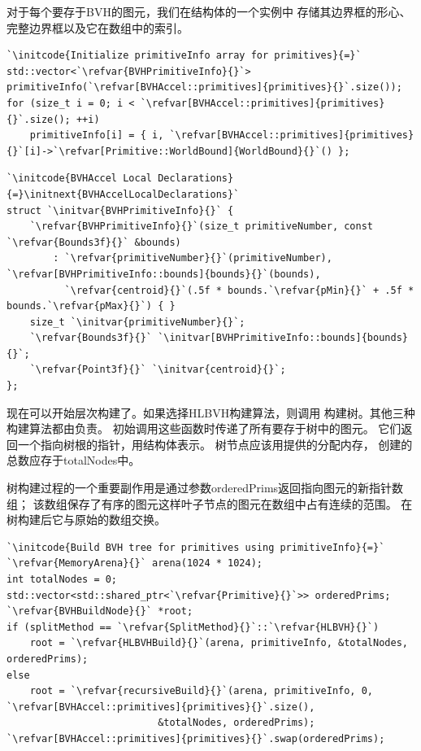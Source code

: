 对于每个要存于BVH的图元，我们在结构体的一个实例中
存储其边界框的形心、完整边界框以及它在数组中的索引。
\begin{lstlisting}
`\initcode{Initialize primitiveInfo array for primitives}{=}`
std::vector<`\refvar{BVHPrimitiveInfo}{}`> primitiveInfo(`\refvar[BVHAccel::primitives]{primitives}{}`.size());
for (size_t i = 0; i < `\refvar[BVHAccel::primitives]{primitives}{}`.size(); ++i)
    primitiveInfo[i] = { i, `\refvar[BVHAccel::primitives]{primitives}{}`[i]->`\refvar[Primitive::WorldBound]{WorldBound}{}`() };
\end{lstlisting}
\begin{lstlisting}
`\initcode{BVHAccel Local Declarations}{=}\initnext{BVHAccelLocalDeclarations}`
struct `\initvar{BVHPrimitiveInfo}{}` {
    `\refvar{BVHPrimitiveInfo}{}`(size_t primitiveNumber, const `\refvar{Bounds3f}{}` &bounds)
        : `\refvar{primitiveNumber}{}`(primitiveNumber), `\refvar[BVHPrimitiveInfo::bounds]{bounds}{}`(bounds),
          `\refvar{centroid}{}`(.5f * bounds.`\refvar{pMin}{}` + .5f * bounds.`\refvar{pMax}{}`) { }
    size_t `\initvar{primitiveNumber}{}`;
    `\refvar{Bounds3f}{}` `\initvar[BVHPrimitiveInfo::bounds]{bounds}{}`;
    `\refvar{Point3f}{}` `\initvar{centroid}{}`;
};
\end{lstlisting}

现在可以开始层次构建了。如果选择HLBVH构建算法，则调用
构建树。其他三种构建算法都由负责。
初始调用这些函数时传递了所有要存于树中的图元。
它们返回一个指向树根的指针，用结构体表示。
树节点应该用提供的分配内存，
创建的总数应存于{\ttfamily *totalNodes}中。

树构建过程的一个重要副作用是通过参数{\ttfamily orderedPrims}返回指向图元的新指针数组；
该数组保存了有序的图元这样叶子节点的图元在数组中占有连续的范围。
在树构建后它与原始的数组交换。
\begin{lstlisting}
`\initcode{Build BVH tree for primitives using primitiveInfo}{=}`
`\refvar{MemoryArena}{}` arena(1024 * 1024);
int totalNodes = 0;
std::vector<std::shared_ptr<`\refvar{Primitive}{}`>> orderedPrims;
`\refvar{BVHBuildNode}{}` *root;
if (splitMethod == `\refvar{SplitMethod}{}`::`\refvar{HLBVH}{}`)
    root = `\refvar{HLBVHBuild}{}`(arena, primitiveInfo, &totalNodes, orderedPrims);
else
    root = `\refvar{recursiveBuild}{}`(arena, primitiveInfo, 0, `\refvar[BVHAccel::primitives]{primitives}{}`.size(),
                          &totalNodes, orderedPrims);
`\refvar[BVHAccel::primitives]{primitives}{}`.swap(orderedPrims);
\end{lstlisting}

